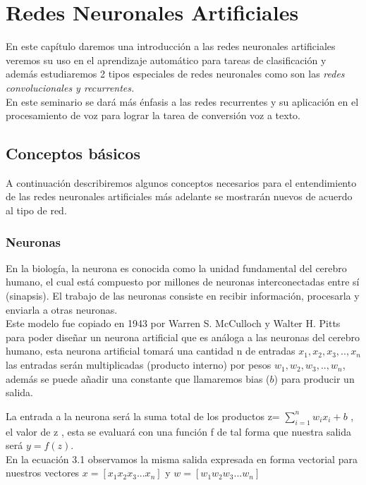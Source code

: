 \chapter{Redes Neuronales Artificiales}

En este capítulo daremos una introducción a las redes neuronales artificiales veremos su uso en el aprendizaje automático para tareas de clasificación y además estudiaremos 2 tipos especiales de redes neuronales como son las \textit{redes convolucionales y recurrentes.}\\
En este seminario se dará más énfasis a las redes recurrentes y su aplicación en el procesamiento de voz para lograr la tarea de conversión voz a texto.



\section{Conceptos básicos}
A continuación describiremos algunos conceptos necesarios para el entendimiento de las redes neuronales artificiales más adelante se mostrarán nuevos de acuerdo al tipo de red.
\subsection{Neuronas}
En la biología, la neurona es conocida como la unidad fundamental del cerebro humano, el cual está compuesto por millones de neuronas interconectadas entre sí (sinapsis). El trabajo de las neuronas consiste en recibir información, procesarla y enviarla a otras neuronas.\\ Este modelo fue copiado en 1943 por Warren S. McCulloch y Walter H. Pitts para poder diseñar un neurona artificial que es análoga a las neuronas del cerebro humano, esta neurona artificial tomará una cantidad n de entradas $x_{1}, x_{2}, x_{3}, .. , x_{n}$ las entradas serán multiplicadas (producto interno) por pesos $w_{1}, w_{2}, w_{3}, .. , w_{n}$, además se puede añadir una constante que llamaremos bias ($b$) para producir un salida.

La entrada a la neurona será la suma total de los productos z=  $\sum_{i=1}^{n}{ w_{i}x_{i}}+b$ , el valor de z , esta se evaluará con una función f de tal forma que nuestra salida será $y=f(z)$.\\ En la ecuación 3.1 observamos la misma salida expresada en forma vectorial para nuestros vectores  $x = [x_{1}  x_{2}  x_{3}  ...  x_{n}]$ y $w = [w_{1}  w_{2}  w_{3}  ...  w_{n}]$



